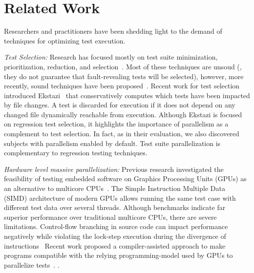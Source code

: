 \section{Related Work}
\label{sec:related}
Researchers and practitioners have been shedding light to the demand
of techniques for optimizing test execution.


\textit{Test Selection:} Research has focused mostly on test suite
minimization, prioritization, reduction, and
selection~\cite{yoo-harman-stvr2012}.   Most of these
techniques are unsoud (\ie{}, they do not guarantee that
fault-revealing tests will be selected), however, more recently, sound
techniques have been
proposed~\cite{gligoric-etal-issta2015,soetens-etal-2016}. Recent work
for test selection introduced
Ekstazi~\cite{ekstazi-web,gligoric-etal-issta2015} that conservatively
computes which tests have been impacted by file changes.  A test is
discarded for execution if it does not depend on any changed file
dynamically reachable from execution. Although Ekstazi is focused on
regression test selection, it highlights the importance of parallelism
as a complement to test selection.  In fact, as in their evaluation,
we also discovered subjects with parallelism enabled by default.  Test
suite parallelization is complementary to regression testing
techniques.

\textit{Hardware level massive parallelization:} Previous research
investigated the feasibility of testing embedded software on Graphics
Processing Units (GPUs) as an alternative to multicore
CPUs~\cite{rajan-etal-ase2014}.  The Simple Instruction Multiple Data
(SIMD) architecture of modern GPUs allows running the same test case
with different test data over several threads.  Although benchmarks
indicate far superior performance over traditional multicore CPUs,
there are severe limitations. Control-flow branching in source code
can impact performance negatively while violating the lock-step
execution during the divergence of instructions~\cite{rajan-etal-ase2014}
Recent work proposed a compiler-assisted approach to make programs
compatible with the relying programming-model used by
GPUs to parallelize tests~\cite{yaneva-etal-issta2017}.
.


